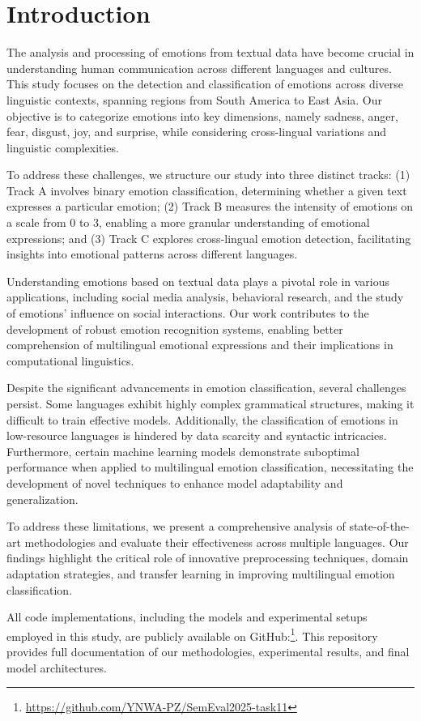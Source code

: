 \section{Introduction}
The analysis and processing of emotions from textual data have become crucial in understanding human communication across different languages and cultures. This study focuses on the detection and classification of emotions across diverse linguistic contexts, spanning regions from South America to East Asia. Our objective is to categorize emotions into key dimensions, namely sadness, anger, fear, disgust, joy, and surprise, while considering cross-lingual variations and linguistic complexities.

To address these challenges, we structure our study into three distinct tracks: (1) Track A involves binary emotion classification, determining whether a given text expresses a particular emotion; (2) Track B measures the intensity of emotions on a scale from 0 to 3, enabling a more granular understanding of emotional expressions; and (3) Track C explores cross-lingual emotion detection, facilitating insights into emotional patterns across different languages.

Understanding emotions based on textual data plays a pivotal role in various applications, including social media analysis, behavioral research, and the study of emotions' influence on social interactions. Our work contributes to the development of robust emotion recognition systems, enabling better comprehension of multilingual emotional expressions and their implications in computational linguistics.

Despite the significant advancements in emotion classification, several challenges persist. Some languages exhibit highly complex grammatical structures, making it difficult to train effective models. Additionally, the classification of emotions in low-resource languages is hindered by data scarcity and syntactic intricacies. Furthermore, certain machine learning models demonstrate suboptimal performance when applied to multilingual emotion classification, necessitating the development of novel techniques to enhance model adaptability and generalization.

To address these limitations, we present a comprehensive analysis of state-of-the-art methodologies and evaluate their effectiveness across multiple languages. Our findings highlight the critical role of innovative preprocessing techniques, domain adaptation strategies, and transfer learning in improving multilingual emotion classification.

All code implementations, including the models and experimental setups employed in this study, are publicly available on GitHub:\footnote{\href{https://github.com/YNWA-PZ/SemEval2025-task11}{https://github.com/YNWA-PZ/SemEval2025-task11}}. This repository provides full documentation of our methodologies, experimental results, and final model architectures.